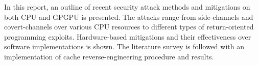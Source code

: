 In this report, an outline of recent security attack methods and mitigations
on both CPU and GPGPU is presented. The attacks range from side-channels and covert-channels over
various CPU resources to different types of return-oriented programming exploits.
Hardware-based mitigations and their effectiveness over software implementations is shown.
The literature survey is followed with an implementation of cache reverse-engineering procedure
and results.
%
%
%
%
%
%

